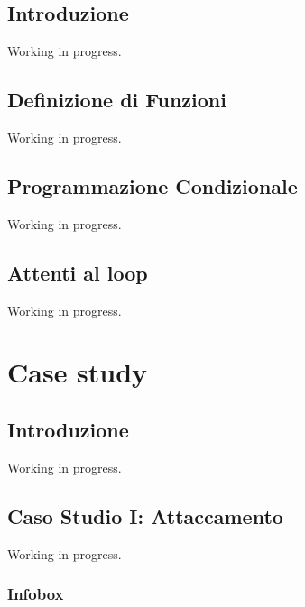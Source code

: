 \documentclass[
]{book}
\begin{document}
\hypertarget{introduzione-1}{%
\chapter*{Introduzione}\label{introduzione-1}}

Working in progress.

\hypertarget{functions}{%
\chapter{Definizione di Funzioni}\label{functions}}

Working in progress.

\hypertarget{coditionals}{%
\chapter{Programmazione Condizionale}\label{coditionals}}

Working in progress.

\hypertarget{loop}{%
\chapter{Attenti al loop}\label{loop}}

Working in progress.

\hypertarget{part-case-study}{%
\part*{Case study}\label{part-case-study}}

\hypertarget{introduzione-2}{%
\chapter*{Introduzione}\label{introduzione-2}}

Working in progress.

\hypertarget{attachment}{%
\chapter{Caso Studio I: Attaccamento}\label{attachment}}

Working in progress.

\hypertarget{infobox}{%
\section{Infobox}\label{infobox}}
\end{document}
